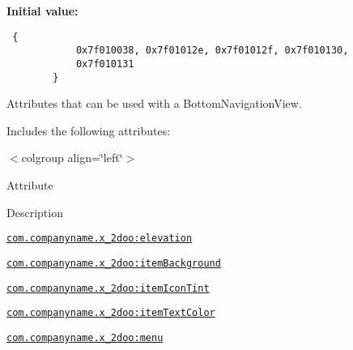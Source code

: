 \textbf{Initial value:}

\begin{Code}\begin{verbatim} {
            0x7f010038, 0x7f01012e, 0x7f01012f, 0x7f010130,
            0x7f010131
        }
\end{verbatim}
\end{Code}
Attributes that can be used with a BottomNavigationView. 

Includes the following attributes: \begin{TabularC}{0}
\hline
\end{TabularC}
$<$colgroup align=\char`\"{}left\char`\"{}$>$ 

Attribute

Description 

{\tt \hyperlink{classandroid_1_1support_1_1v4_1_1_r_1_1styleable_fa96e594c72f2eba30a1c5154a95b87e}{com.companyname.x\_\-2doo:elevation}}

{\tt \hyperlink{classandroid_1_1support_1_1v4_1_1_r_1_1styleable_330b02e19c11aae9367f4261f0e3d83e}{com.companyname.x\_\-2doo:itemBackground}}

{\tt \hyperlink{classandroid_1_1support_1_1v4_1_1_r_1_1styleable_79d29538f6e5b9f23314f6cfa696688f}{com.companyname.x\_\-2doo:itemIconTint}}

{\tt \hyperlink{classandroid_1_1support_1_1v4_1_1_r_1_1styleable_587ccbdac026a0e313be585abff19ab0}{com.companyname.x\_\-2doo:itemTextColor}}

{\tt \hyperlink{classandroid_1_1support_1_1v4_1_1_r_1_1styleable_b466b14ca9f60097882bb309cd4e7d6f}{com.companyname.x\_\-2doo:menu}}

